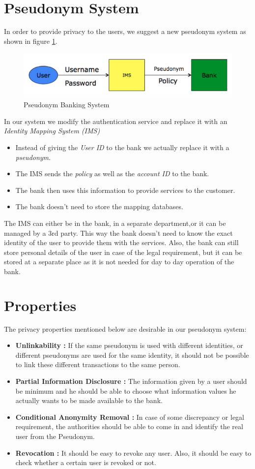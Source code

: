 \section{Pseudonym System}
In order to provide privacy to the users, we suggest a new pseudonym system as shown in figure \ref{fig:Pseudonym}.
\begin{figure}[h]
\centering
\includegraphics[width=\textwidth]{figures/Pseudonym}
\caption{Pseudonym Banking System}
\label{fig:Pseudonym}
\end{figure}
In our system we modify the authentication service and replace it with an \textit{Identity Mapping System (IMS)}
\begin{itemize}
	\item Instead of giving the \textit{User ID} to the bank we actually replace it with a \textit{pseudonym}.
	\item The IMS sends the \textit{policy} as well as the \textit{account ID} to the bank.	
	\item The bank then uses this information to provide services to the customer.
	\item The bank doesn’t need to store the mapping databases.
\end{itemize}
The IMS can either be in the bank, in a separate department,or it can be managed by a 3rd party. This way the bank doesn’t need to know the exact identity of the user to provide them with the services.
Also, the bank can still store personal details of the user in case of the legal requirement, but it can be stored at a separate place as it is not needed for day to day operation of the bank.
\section{Properties}
The privacy properties mentioned below are desirable in our pseudonym system:
\begin{itemize}
	\item \textbf{Unlinkability :} If the same pseudonym is used with different identities, or different pseudonyms are used for the same identity, it should not be possible to link these different transactions to the same person. 
	\item \textbf{Partial Information Disclosure :} The information given by a user should be minimum and he should be able to choose what information values he actually wants to be made available to the bank. 
	\item \textbf{Conditional Anonymity Removal :} In case of some discrepancy or legal requirement, the authorities should be able to come in and identify the real user from the Pseudonym.
	\item \textbf{Revocation :} It should be easy to revoke any user. Also, it should be easy to check whether a certain user is revoked or not. 
\end{itemize}
